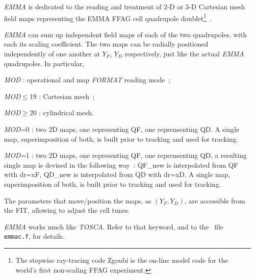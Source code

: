 \noindent  \textsl{EMMA} is dedicated to the reading and treatment of 2-D or 
3-D Cartesian  mesh field maps representing the EMMA FFAG  cell quadrupole 
doublet\footnote{The stepwise ray-tracing code Zgoubi is the on-line model 
code for the world’s first non-scaling FFAG experiment.}~\cite{EMMAIPAC10,EMMA}. 

\medskip

\noindent  \textsl{EMMA}  can sum up independent field maps of each of the two quadrupoles, with each its 
scaling coefficient. The two maps can be radially  positioned independently of 
one another at $Y_F$, $Y_D$ respectively, just like the 
actual  \textsl{EMMA} quadrupoles. In particular, 

\medskip

  \textsl{MOD} : operational and map \textsl{FORMAT} reading mode~; 
  
  \textsl{MOD}$\le$19 : Cartesian mesh~; 
  
  \textsl{MOD}$\ge$20 : cylindrical mesh.

\medskip

  \textsl{MOD}=0 : two 2D maps, one representing QF, one reprensenting QD. 
 A single map, superimposition of both, is built prior to tracking
 and used for tracking. 


  \textsl{MOD}=1 : two 2D maps, one representing QF, one reprensenting QD, 
 a resulting single map is devised in the following way~: 
  QF\_new is interpolated from QF with dr=xF, 
  QD\_new is interpolated from QD with dr=xD. 
 A single map, superimposition of both, is built prior to tracking
 and used for tracking. 

%


\medskip

\noindent The parameters that move/position the maps, as $(Y_F,Y_D)$, 
                are accessible from the FIT, allowing to  adjust the cell tunes. 


\medskip

\noindent  \textsl{EMMA}    works much like  \textsl{TOSCA}.  Refer to that keyword, and to the \FORTRAN\ file 
\texttt{emmac.f}, for details. 









